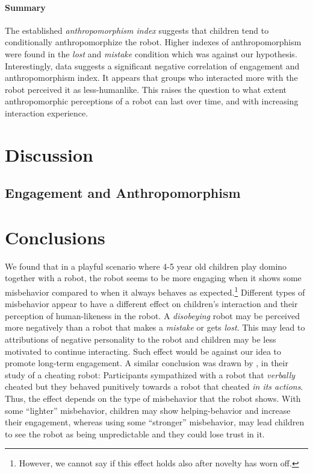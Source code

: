 \documentclass{sig-alternate}
\begin{document}

\paragraph{Summary}

The established \textit{anthropomorphism index} suggests that children tend to
conditionally anthropomorphize the robot. Higher indexes of anthropomorphism
were found in the \textit{lost} and \textit{mistake} condition which was against
our hypothesis. Interestingly, data suggests a significant negative correlation
of engagement and anthropomorphism index. It appears that groups who interacted
more with the robot perceived it as less-humanlike. This raises the question to
what extent anthropomorphic perceptions of a robot can last over time, and with
increasing interaction experience.

\section{Discussion}

\subsection{Engagement and Anthropomorphism}


\section{Conclusions}

We found that in a playful scenario where 4-5 year old children play domino
together with a robot, the robot seems to be more engaging when it shows some
misbehavior compared to when it always behaves as expected.\footnote{However, we
cannot say if this effect holds also after novelty has worn off.} Different
types of misbehavior appear to have a different effect on children's interaction
and their perception of human-likeness in the robot. A \textit{disobeying} robot
may be perceived more negatively than a robot that makes a \textit{mistake} or
gets \textit{lost}. This may lead to attributions of negative personality to the
robot and children may be less motivated to continue interacting. Such effect
would be against our idea to promote long-term engagement. A similar conclusion
was drawn by \cite{short_no_2010}, in their study of a cheating robot:
Participants sympathized with a robot that \textit{verbally} cheated but they
behaved punitively towards a robot that cheated \textit{in its actions}.  Thus,
the effect depends on the type of misbehavior that the robot shows. With some
``lighter'' misbehavior, children may show helping-behavior and increase their
engagement, whereas using some ``stronger'' misbehavior, may lead children to
see the robot as being unpredictable and they could lose trust in it.
\end{document}
